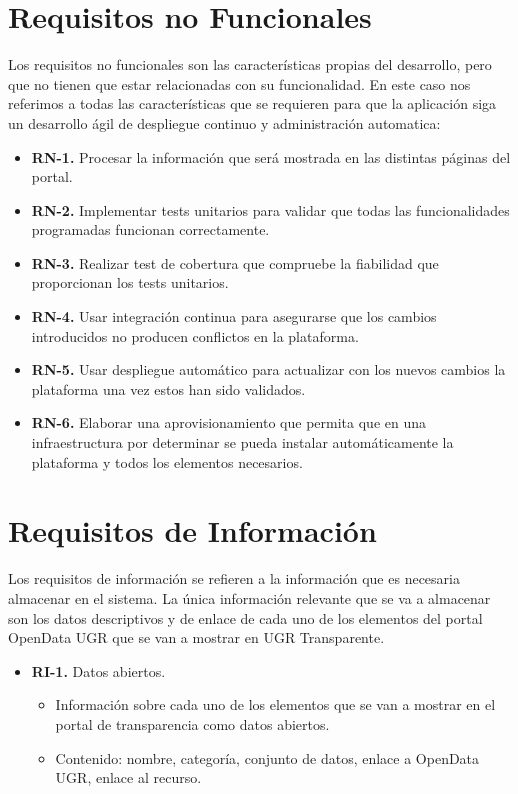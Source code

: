 \section{Requisitos no Funcionales}

Los requisitos no funcionales son las características propias del desarrollo, pero que no tienen que estar relacionadas con su 
funcionalidad. En este caso nos referimos a todas las características que se requieren para que la aplicación siga un 
desarrollo ágil de despliegue continuo y administración automatica:

\begin{itemize}
  \item \textbf{RN-1.} Procesar la información que será mostrada en las distintas páginas del portal.
  \item \textbf{RN-2.} Implementar tests unitarios para validar que todas las funcionalidades programadas funcionan 
  correctamente.
  \item \textbf{RN-3.} Realizar test de cobertura que compruebe la fiabilidad que proporcionan los tests unitarios.
  \item \textbf{RN-4.} Usar integración continua para asegurarse que los cambios introducidos no producen conflictos en la 
  plataforma.
  \item \textbf{RN-5.} Usar despliegue automático para actualizar con los nuevos cambios la plataforma una vez estos han sido 
  validados.
  \item \textbf{RN-6.} Elaborar una aprovisionamiento que permita que en una infraestructura por determinar se pueda instalar 
  automáticamente la plataforma y todos los elementos necesarios.
\end{itemize}

\section{Requisitos de Información}

Los requisitos de información se refieren a la información que es necesaria almacenar en el sistema. La única información 
relevante que se va a almacenar son los datos descriptivos y de enlace de cada uno de los elementos del portal OpenData UGR 
que se van a mostrar en UGR Transparente.

\begin{itemize}
  \item \textbf{RI-1.} Datos abiertos.
  \begin{itemize}
    \item Información sobre cada uno de los elementos que se van a mostrar en el portal de transparencia como datos abiertos.
    \item Contenido: nombre, categoría, conjunto de datos, enlace a OpenData UGR, enlace al recurso.
  \end{itemize}
\end{itemize}